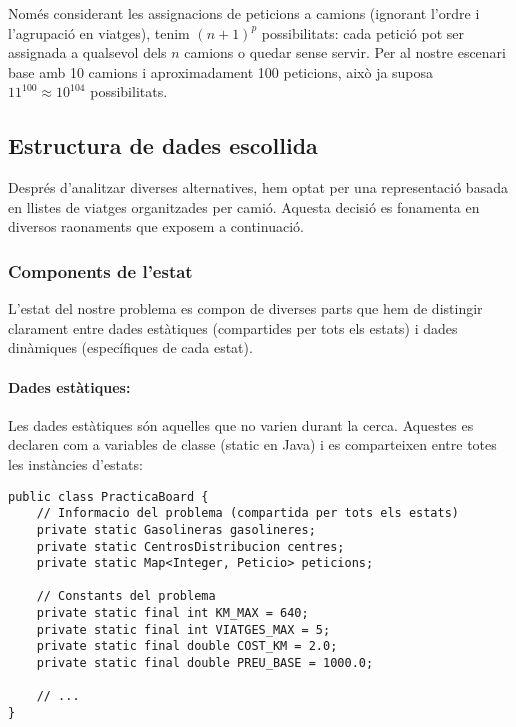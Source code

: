 Només considerant les assignacions de peticions a camions (ignorant l'ordre i l'agrupació en viatges), tenim $(n+1)^p$ possibilitats: cada petició pot ser assignada a qualsevol dels $n$ camions o quedar sense servir. Per al nostre escenari base amb 10 camions i aproximadament 100 peticions, això ja suposa $11^{100} \approx 10^{104}$ possibilitats.

\vspace{0.5cm}

\subsection{Estructura de dades escollida}

Després d'analitzar diverses alternatives, hem optat per una representació basada en llistes de viatges organitzades per camió. Aquesta decisió es fonamenta en diversos raonaments que exposem a continuació.

\vspace{0.5cm}

\subsubsection{Components de l'estat}

L'estat del nostre problema es compon de diverses parts que hem de distingir clarament entre dades estàtiques (compartides per tots els estats) i dades dinàmiques (específiques de cada estat).

\paragraph{Dades estàtiques:}

Les dades estàtiques són aquelles que no varien durant la cerca. Aquestes es declaren com a variables de classe (static en Java) i es comparteixen entre totes les instàncies d'estats:

\begin{lstlisting}[caption={Dades estàtiques de l'estat}, label={lst:static-data}]
public class PracticaBoard {
    // Informacio del problema (compartida per tots els estats)
    private static Gasolineras gasolineres;
    private static CentrosDistribucion centres;
    private static Map<Integer, Peticio> peticions;
    
    // Constants del problema
    private static final int KM_MAX = 640;
    private static final int VIATGES_MAX = 5;
    private static final double COST_KM = 2.0;
    private static final double PREU_BASE = 1000.0;
    
    // ...
}
\end{lstlisting}

